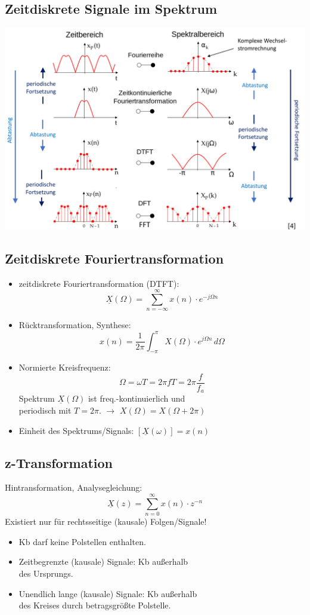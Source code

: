 \subsection{Zeitdiskrete Signale im Spektrum}
\includegraphics[width=\columnwidth]{Bilder/uebersicht_abtastung_frequenzbereich}
\clearpage
\subsection{Zeitdiskrete Fouriertransformation}
\begin{itemize}
\item zeitdiskrete Fouriertransformation (DTFT):
\[ \boxed{
\underline{X}(\Omega) = \sum_{n=-\infty}^{\infty} x(n) \cdot e^{-j\Omega n}
}
\]
\item Rücktransformation, Synthese:
\[
x(n) = \frac{1}{2\pi}\int_{-\pi}^{\pi} X(\Omega) \cdot  e^{j\Omega n} \, d\Omega
\]
\item Normierte Kreisfrequenz:
\[ \boxed{
\Omega = \omega T = 2\pi f T = 2\pi \frac{f}{f_a} }
\]
{\small Spektrum $\underline{X}(\Omega)$ ist freq.-kontinuierlich und\\ periodisch mit $T=2\pi$. $\rightarrow$ $X(\Omega)=X(\Omega+2\pi)$}
\item Einheit des Spektrums/Signals: $[\underline{X}(\omega)] = x(n)$
\end{itemize}

\subsection{z-Transformation}
Hintransformation, Analysegleichung: 
\[\boxed{
	\underline{X}(z) = \sum_{n=0}^{\infty} x(n) \cdot z^{-n} }
\]
Existiert nur für rechtsseitige (kausale) Folgen/Signale!
\small
\begin{itemize}
	\item Kb darf keine Polstellen enthalten.
	\item Zeitbegrenzte (kausale) Signale: Kb außerhalb\\ des Ursprungs.
	\item Unendlich lange (kausale) Signale: Kb außerhalb\\ des Kreises durch betragsgrößte Polstelle.
\end{itemize}
\normalsize

